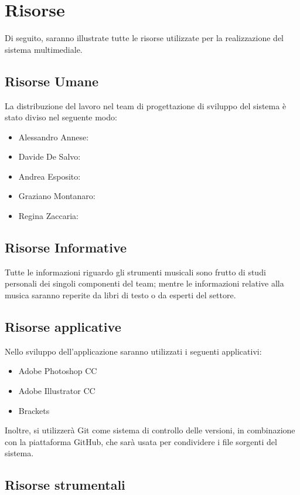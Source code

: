 \section{Risorse}
Di seguito, saranno illustrate tutte le risorse utilizzate per la realizzazione del sistema multimediale.
\subsection{Risorse Umane}
La distribuzione del lavoro nel team di progettazione di sviluppo del sistema è stato diviso nel seguente modo:
\begin{itemize}
	\item Alessandro Annese: 
	\item Davide De Salvo:
	\item Andrea Esposito:
	\item Graziano Montanaro:
	\item Regina Zaccaria:
\end{itemize}

\subsection{Risorse Informative}
Tutte le informazioni riguardo gli strumenti musicali sono frutto di studi personali dei singoli componenti del team; mentre le informazioni relative alla musica saranno reperite da libri di testo o da esperti del settore.

\subsection{Risorse applicative}
Nello sviluppo dell'applicazione saranno utilizzati i seguenti applicativi:
\begin{itemize}
	\item Adobe Photoshop CC
	\item Adobe Illustrator CC
	\item Brackets
\end{itemize}
Inoltre, si utilizzerà Git come sistema di controllo delle versioni, in combinazione con la piattaforma GitHub, che sarà usata per condividere i file sorgenti del sistema.

\subsection{Risorse strumentali}

